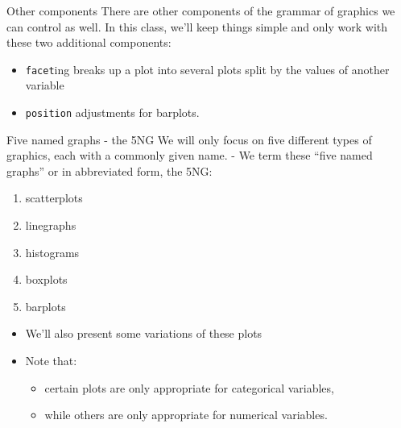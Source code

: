 \documentclass[
  ignorenonframetext,
]{beamer}
\providecommand{\tightlist}{%
  \setlength{\itemsep}{0pt}\setlength{\parskip}{0pt}}
\begin{document}
\begin{frame}[fragile]{Other components}
\label{other-components}
There are other components of the grammar of graphics we can control as
well. In this class, we'll keep things simple and only work with these
two additional components:

\begin{itemize}
\item
  \texttt{facet}ing breaks up a plot into several plots split by the
  values of another variable
\item
  \texttt{position} adjustments for barplots.
\end{itemize}
\end{frame}

\begin{frame}{Five named graphs - the 5NG}
\label{five-named-graphs---the-5ng}
We will only focus on five different types of graphics, each with a
commonly given name. - We term these ``five named graphs'' or in
abbreviated form, the 5NG:

\begin{enumerate}
\tightlist
\item
  scatterplots
\item
  linegraphs
\item
  histograms
\item
  boxplots
\item
  barplots
\end{enumerate}

\begin{itemize}
\item
  We'll also present some variations of these plots
\item
  Note that:

  \begin{itemize}
  \tightlist
  \item
    certain plots are only appropriate for categorical variables,
  \item
    while others are only appropriate for numerical variables.
  \end{itemize}
\end{itemize}
\end{frame}
\end{document}
